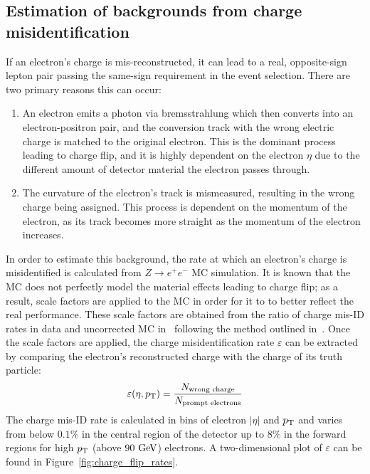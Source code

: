 \subsection{Estimation of backgrounds from charge misidentification}\label{ssww13tev:charge_misid}
If an electron's charge is mis-reconstructed, it can lead to a real, opposite-sign lepton pair passing the same-sign requirement in the event selection.
There are two primary reasons this can occur:
\begin{enumerate}
\item An electron emits a photon via bremsstrahlung which then converts into an electron-positron pair, and the conversion track with the wrong electric charge is matched to the original electron.
This is the dominant process leading to charge flip, and it is highly dependent on the electron $\eta$ due to the different amount of detector material the electron passes through.
\item The curvature of the electron's track is mismeasured, resulting in the wrong charge being assigned.
This process is dependent on the momentum of the electron, as its track becomes more straight as the momentum of the electron increases.
\end{enumerate}

In order to estimate this background, the rate at which an electron's charge is misidentified is calculated from $Z\rightarrow e^{+}e^{-}$ MC simulation.
It is known that the MC does not perfectly model the material effects leading to charge flip; as a result, scale factors are applied to the MC in order for it to to better reflect the real performance.
These scale factors are obtained from the ratio of charge mis-ID rates in data and uncorrected MC in~\cite{2018.ssww-13tev-atlas-support} following the method outlined in~\cite{2017.charge-flip-support}.
Once the scale factors are applied, the charge misidentification rate $\varepsilon$ can be extracted by comparing the electron's reconstructed charge with the charge of its truth particle:
\begin{equation}
  \varepsilon(\eta,\pt) = \frac{N_{\textrm{wrong\ charge}}}{N_{\textrm{prompt\ electrons}}}
\end{equation}
The charge mis-ID rate is calculated in bins of electron $|\eta|$ and $p_{\mathrm{T}}$ and varies from below $0.1\%$ in the central region of the detector up to $8\%$ in the forward regions for high $p_{\mathrm{T}}$ (above $90\gev$) electrons.
A two-dimensional plot of $\varepsilon$ can be found in Figure~\ref{fig:charge_flip_rates}.


